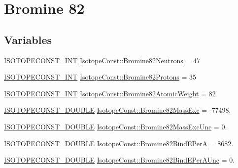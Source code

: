 \hypertarget{group___isotope_const-_bromine-_br82}{}\section{Bromine 82}
\label{group___isotope_const-_bromine-_br82}
\subsection*{Variables}
\begin{DoxyCompactItemize}
\item 
\mbox{\hyperlink{group___isotope_const-_macros_ga5f18360b3e99483a35c32d789e62621c}{I\+S\+O\+T\+O\+P\+E\+C\+O\+N\+S\+T\+\_\+\+I\+NT}} \mbox{\hyperlink{group___isotope_const-_bromine-_br82_gac9d29c12e1fab3d1722850a2e8eb13d1}{Isotope\+Const\+::\+Bromine82\+Neutrons}} = 47
\item 
\mbox{\hyperlink{group___isotope_const-_macros_ga5f18360b3e99483a35c32d789e62621c}{I\+S\+O\+T\+O\+P\+E\+C\+O\+N\+S\+T\+\_\+\+I\+NT}} \mbox{\hyperlink{group___isotope_const-_bromine-_br82_gad7f2aca748f950a013bf96e67df2bdd7}{Isotope\+Const\+::\+Bromine82\+Protons}} = 35
\item 
\mbox{\hyperlink{group___isotope_const-_macros_ga5f18360b3e99483a35c32d789e62621c}{I\+S\+O\+T\+O\+P\+E\+C\+O\+N\+S\+T\+\_\+\+I\+NT}} \mbox{\hyperlink{group___isotope_const-_bromine-_br82_ga8a793f1f0b5d45f9707a9fa09745da64}{Isotope\+Const\+::\+Bromine82\+Atomic\+Weight}} = 82
\item 
\mbox{\hyperlink{group___isotope_const-_macros_ga8f45a7272ce02c0b4c65c44636ed719a}{I\+S\+O\+T\+O\+P\+E\+C\+O\+N\+S\+T\+\_\+\+D\+O\+U\+B\+LE}} \mbox{\hyperlink{group___isotope_const-_bromine-_br82_ga3e931a76058eea38be6281faa97da324}{Isotope\+Const\+::\+Bromine82\+Mass\+Exc}} = -\/77498.
\item 
\mbox{\hyperlink{group___isotope_const-_macros_ga8f45a7272ce02c0b4c65c44636ed719a}{I\+S\+O\+T\+O\+P\+E\+C\+O\+N\+S\+T\+\_\+\+D\+O\+U\+B\+LE}} \mbox{\hyperlink{group___isotope_const-_bromine-_br82_ga6790fb2143c541915d5d367c8a6c18a7}{Isotope\+Const\+::\+Bromine82\+Mass\+Exc\+Unc}} = 0.
\item 
\mbox{\hyperlink{group___isotope_const-_macros_ga8f45a7272ce02c0b4c65c44636ed719a}{I\+S\+O\+T\+O\+P\+E\+C\+O\+N\+S\+T\+\_\+\+D\+O\+U\+B\+LE}} \mbox{\hyperlink{group___isotope_const-_bromine-_br82_ga0ea8498d7ef48b03ac16900567f88f12}{Isotope\+Const\+::\+Bromine82\+Bind\+E\+PerA}} = 8682.
\item 
\mbox{\hyperlink{group___isotope_const-_macros_ga8f45a7272ce02c0b4c65c44636ed719a}{I\+S\+O\+T\+O\+P\+E\+C\+O\+N\+S\+T\+\_\+\+D\+O\+U\+B\+LE}} \mbox{\hyperlink{group___isotope_const-_bromine-_br82_gaaf989be11100b1a95c0ea29faf33fc75}{Isotope\+Const\+::\+Bromine82\+Bind\+E\+Per\+A\+Unc}} = 0.

\end{DoxyCompactItemize}
